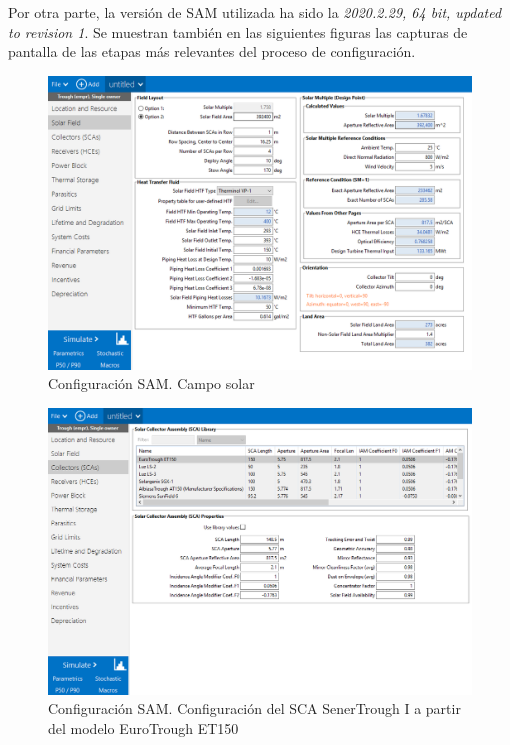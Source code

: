 \documentclass[12pt]{report} %
\begin{document}
Por otra parte, la versión de SAM utilizada ha sido la \emph{2020.2.29, 64 bit, updated to revision 1}. Se muestran también en las siguientes figuras las capturas de pantalla de las etapas más relevantes del proceso de configuración.

\begin{figure}
\includegraphics[scale=0.8]{images/captura_sam01.png}
\caption{Configuración SAM. Campo solar} 
\label{fig:captura01}
\end{figure}

\begin{figure}
\includegraphics[scale=0.8]{images/captura_sam02.png}
\caption{Configuración SAM. Configuración del SCA SenerTrough I a partir del modelo EuroTrough ET150} 
\label{fig:captura02}
\end{figure}
\end{document}

